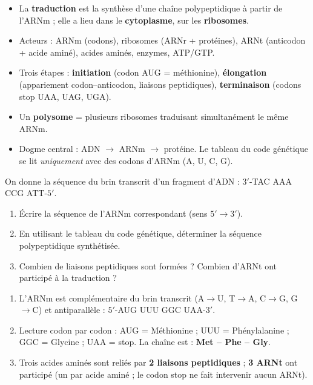 \documentclass[11pt]{article}
\begin{document}
\begin{aretenir}
\begin{itemize}
\item La \textbf{traduction} est la synthèse d'une chaîne polypeptidique à partir de l'ARNm ; elle a lieu dans le \textbf{cytoplasme}, sur les \textbf{ribosomes}.
\item Acteurs : ARNm (codons), ribosomes (ARNr + protéines), ARNt (anticodon + acide aminé), acides aminés, enzymes, ATP/GTP.
\item Trois étapes : \textbf{initiation} (codon AUG = méthionine), \textbf{élongation} (appariement codon--anticodon, liaisons peptidiques), \textbf{terminaison} (codons stop UAA, UAG, UGA).
\item Un \textbf{polysome} = plusieurs ribosomes traduisant simultanément le même ARNm.
\item Dogme central : ADN $\rightarrow$ ARNm $\rightarrow$ protéine. Le tableau du code génétique se lit \emph{uniquement} avec des codons d'ARNm (A, U, C, G).
\end{itemize}
\end{aretenir}

\begin{exercice}
On donne la séquence du brin transcrit d'un fragment d'ADN : $3'$-TAC AAA CCG ATT-$5'$.
\begin{enumerate}
\item Écrire la séquence de l'ARNm correspondant (sens $5' \rightarrow 3'$).
\item En utilisant le tableau du code génétique, déterminer la séquence polypeptidique synthétisée.
\item Combien de liaisons peptidiques sont formées ? Combien d'ARNt ont participé à la traduction ?
\end{enumerate}
\end{exercice}

\begin{corrige}
\begin{enumerate}
\item L'ARNm est complémentaire du brin transcrit (A$\rightarrow$U, T$\rightarrow$A, C$\rightarrow$G, G$\rightarrow$C) et antiparallèle : $5'$-AUG UUU GGC UAA-$3'$.
\item Lecture codon par codon : AUG = Méthionine ; UUU = Phénylalanine ; GGC = Glycine ; UAA = stop. La chaîne est : \textbf{Met -- Phe -- Gly}.
\item Trois acides aminés sont reliés par \textbf{2 liaisons peptidiques} ; \textbf{3 ARNt} ont participé (un par acide aminé ; le codon stop ne fait intervenir aucun ARNt).
\end{enumerate}
\end{corrige}
\end{document}
